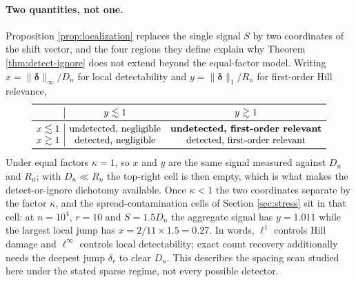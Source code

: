\documentclass[11pt]{article}
\begin{document}
\paragraph{Two quantities, not one.}
Proposition \ref{prop:localization} replaces the single signal $S$ by two
coordinates of the shift vector, and the four regions they define explain why
Theorem \ref{thm:detect-ignore} does not extend beyond the equal-factor model.
Writing $x=\|\boldsymbol\delta\|_\infty/D_n$ for local detectability and
$y=\|\boldsymbol\delta\|_1/R_n$ for first-order Hill relevance,
\[
\begin{array}{l|cc}
\toprule
 & y\lesssim1 & y\gtrsim1\\
\midrule
x\lesssim1 & \hbox{undetected, negligible}
           & \hbox{\bf undetected, first-order relevant}\\
x\gtrsim1 & \hbox{detected, negligible}
          & \hbox{detected, first-order relevant}\\
\bottomrule
\end{array}
\]
Under equal factors $\kappa=1$, so $x$ and $y$ are the same signal measured
against $D_n$ and $R_n$; with $D_n\ll R_n$ the top-right cell is then empty,
which is what makes the detect-or-ignore dichotomy available.  Once
$\kappa<1$ the two coordinates separate by the factor $\kappa$, and the
spread-contamination cells of Section \ref{sec:stress} sit in that cell: at
$n=10^4$, $r=10$ and $S=1.5D_n$ the aggregate signal has $y=1.011$ while the
largest local jump has $x=2/11\times1.5=0.27$.  In words, $\ell^1$ controls
Hill damage and $\ell^\infty$ controls local detectability; exact count
recovery additionally needs the deepest jump $\delta_r$ to clear $D_n$.  This
describes the spacing scan studied here under the stated sparse regime, not
every possible detector.
\end{document}
